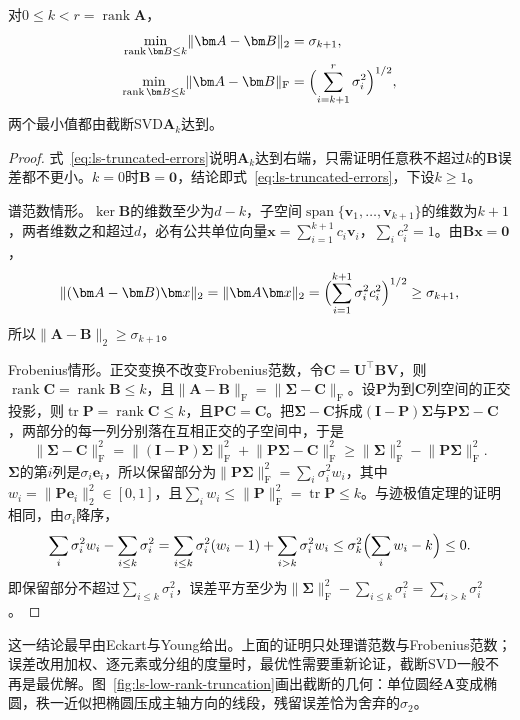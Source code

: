 \begin{theorem}
\label{thm:ls-best-low-rank}
\label{thm:matrix-analysis-best-low-rank}
对$0\leq k<r=\operatorname{rank}\bm A$，
\begin{align}
 \min_{\operatorname{rank}\bm B\leq k}\lVert\bm A-\bm B\rVert_2
 &=\sigma_{k+1},
 \label{eq:matrix-analysis-best-rank-k-spectral}\\
 \min_{\operatorname{rank}\bm B\leq k}\lVert\bm A-\bm B\rVert_{\mathrm F}
 &=\Bigl(\sum_{i=k+1}^r\sigma_i^2\Bigr)^{1/2},
 \label{eq:matrix-analysis-best-rank-k-frobenius}
\end{align}
两个最小值都由截断SVD$\bm A_k$达到。
\end{theorem}
\begin{proof}
式~\eqref{eq:ls-truncated-errors}说明$\bm A_k$达到右端，只需证明任意秩不超过$k$的$\bm B$误差都不更小。$k=0$时$\bm B=\bm0$，结论即式~\eqref{eq:ls-truncated-errors}，下设$k\geq1$。

谱范数情形。$\ker\bm B$的维数至少为$d-k$，子空间$\operatorname{span}\{\bm v_1,\ldots,\bm v_{k+1}\}$的维数为$k+1$，两者维数之和超过$d$，必有公共单位向量$\bm x=\sum_{i=1}^{k+1}c_i\bm v_i$，$\sum_ic_i^2=1$。由$\bm B\bm x=\bm0$，
\begin{equation}
 \lVert(\bm A-\bm B)\bm x\rVert_2
 =\lVert\bm A\bm x\rVert_2
 =\Bigl(\sum_{i=1}^{k+1}\sigma_i^2c_i^2\Bigr)^{1/2}
 \geq\sigma_{k+1},
 \label{eq:ls-spectral-lower-bound}
\end{equation}
所以$\lVert\bm A-\bm B\rVert_2\geq\sigma_{k+1}$。

Frobenius情形。正交变换不改变Frobenius范数，令$\bm C=\bm U^\top\bm B\bm V$，则$\operatorname{rank}\bm C=\operatorname{rank}\bm B\leq k$，且$\lVert\bm A-\bm B\rVert_{\mathrm F}=\lVert\bm\Sigma-\bm C\rVert_{\mathrm F}$。设$\bm P$为到$\bm C$列空间的正交投影，则$\operatorname{tr}\bm P=\operatorname{rank}\bm C\leq k$，且$\bm P\bm C=\bm C$。把$\bm\Sigma-\bm C$拆成$(\bm I-\bm P)\bm\Sigma$与$\bm P\bm\Sigma-\bm C$，两部分的每一列分别落在互相正交的子空间中，于是
\[
 \lVert\bm\Sigma-\bm C\rVert_{\mathrm F}^2
 =\lVert(\bm I-\bm P)\bm\Sigma\rVert_{\mathrm F}^2+\lVert\bm P\bm\Sigma-\bm C\rVert_{\mathrm F}^2
 \geq\lVert\bm\Sigma\rVert_{\mathrm F}^2-\lVert\bm P\bm\Sigma\rVert_{\mathrm F}^2 .
\]
$\bm\Sigma$的第$i$列是$\sigma_i\bm e_i$，所以保留部分为$\lVert\bm P\bm\Sigma\rVert_{\mathrm F}^2=\sum_i\sigma_i^2w_i$，其中$w_i=\lVert\bm P\bm e_i\rVert_2^2\in[0,1]$，且$\sum_iw_i\leq\lVert\bm P\rVert_{\mathrm F}^2=\operatorname{tr}\bm P\leq k$。与迹极值定理的证明相同，由$\sigma_i$降序，
\[
 \sum_i\sigma_i^2w_i-\sum_{i\leq k}\sigma_i^2
 =\sum_{i\leq k}\sigma_i^2(w_i-1)+\sum_{i>k}\sigma_i^2w_i
 \leq\sigma_k^2\Bigl(\sum_iw_i-k\Bigr)\leq0 .
\]
即保留部分不超过$\sum_{i\leq k}\sigma_i^2$，误差平方至少为$\lVert\bm\Sigma\rVert_{\mathrm F}^2-\sum_{i\leq k}\sigma_i^2=\sum_{i>k}\sigma_i^2$。
\end{proof}
这一结论最早由Eckart与Young给出。上面的证明只处理谱范数与Frobenius范数；误差改用加权、逐元素或分组的度量时，最优性需要重新论证，截断SVD一般不再是最优解。图~\ref{fig:ls-low-rank-truncation}画出截断的几何：单位圆经$\bm A$变成椭圆，秩一近似把椭圆压成主轴方向的线段，残留误差恰为舍弃的$\sigma_2$。

